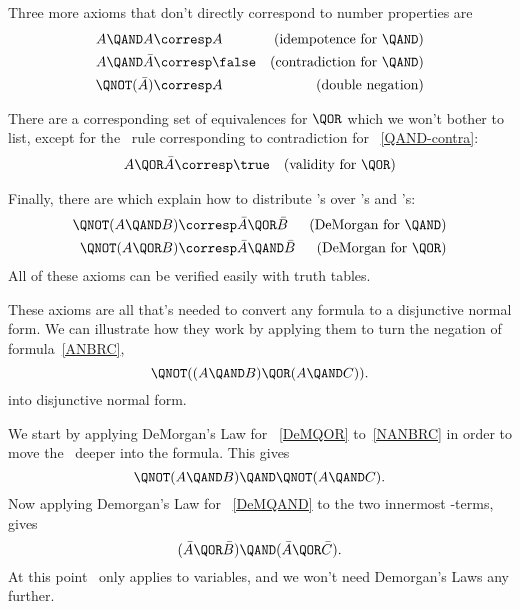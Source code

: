 Three more axioms that don't directly correspond to number properties
are
\begin{align}
A \QAND A       &\corresp A
         & \text{(idempotence for \QAND)}\notag\\
A \QAND \bar{A} & \corresp \false
         & \text{(contradiction for \QAND)}\label{QAND-contra}\\
\QNOT(\bar{A})  & \corresp A
         & \text{(double negation)}\label{double-neg}
\end{align}

There are a corresponding set of equivalences for $\QOR$ which we
won't bother to list, except for the \QOR\ rule corresponding to
contradiction for \QAND~\eqref{QAND-contra}:
\begin{align}
A \QOR \bar{A} & \corresp \true  & \text{(validity for \QOR)}\label{QOR-true}
\end{align}

\iffalse
There is also a familiar rule connecting \QAND\ and \QOR:
\begin{align}
\lefteqn{A \QAND (B \QOR C)}\notag\\
 & \corresp (A \QAND B) \QOR (A \QAND C) &\qquad \text{(distributivity
  of \QAND\ over \QOR)}\label{qand-distributivity}
\end{align}
\fi

Finally, there are %
which explain how to
distribute \QNOT's over \QAND's and \QOR's:
\begin{align}
\QNOT(A \QAND B) &\corresp \bar{A} \QOR \bar{B} & \text{(DeMorgan for \QAND)} \label{DeMQAND}\\
\QNOT(A \QOR B) &\corresp \bar{A} \QAND \bar{B} & \text{(DeMorgan for \QOR)}
\label{DeMQOR} 
\end{align}
All of these axioms can be verified easily with truth tables.

These axioms are all that's needed to convert any formula to a
disjunctive normal form.  We can illustrate how they work by applying
them to turn the negation of formula~\eqref{ANBRC},
\begin{equation}\label{NANBRC}
\QNOT((A \QAND B) \QOR (A \QAND C)).
\end{equation}
into disjunctive normal form.

We start by applying DeMorgan's Law for \QOR~\eqref{DeMQOR}
to~\eqref{NANBRC} in order to move the \QNOT\ deeper into the formula.
This gives
\[
\QNOT(A \QAND B) \QAND \QNOT(A \QAND C).
\]
Now applying Demorgan's Law for \QAND~\eqref{DeMQAND} to the two
innermost \QAND-terms, gives
\begin{equation}\label{NAONBANAONC}
(\bar{A} \QOR \bar{B}) \QAND (\bar{A} \QOR \bar{C}).
\end{equation}
At this point \QNOT\ only applies to variables, and we won't need
Demorgan's Laws any further.

